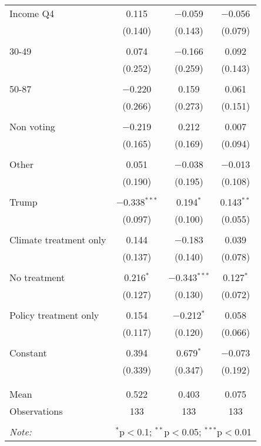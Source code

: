 \begin{tabular}{@{\extracolsep{5pt}}lccc}
 Income Q4 & 0.115 & $-$0.059 & $-$0.056 \\ 
  & (0.140) & (0.143) & (0.079) \\ 
  & & & \\ 
 30-49 & 0.074 & $-$0.166 & 0.092 \\ 
  & (0.252) & (0.259) & (0.143) \\ 
  & & & \\ 
 50-87 & $-$0.220 & 0.159 & 0.061 \\ 
  & (0.266) & (0.273) & (0.151) \\ 
  & & & \\ 
 Non voting & $-$0.219 & 0.212 & 0.007 \\ 
  & (0.165) & (0.169) & (0.094) \\ 
  & & & \\ 
 Other & 0.051 & $-$0.038 & $-$0.013 \\ 
  & (0.190) & (0.195) & (0.108) \\ 
  & & & \\ 
 Trump & $-$0.338$^{***}$ & 0.194$^{*}$ & 0.143$^{**}$ \\ 
  & (0.097) & (0.100) & (0.055) \\ 
  & & & \\ 
 Climate treatment only & 0.144 & $-$0.183 & 0.039 \\ 
  & (0.137) & (0.140) & (0.078) \\ 
  & & & \\ 
 No treatment & 0.216$^{*}$ & $-$0.343$^{***}$ & 0.127$^{*}$ \\ 
  & (0.127) & (0.130) & (0.072) \\ 
  & & & \\ 
 Policy treatment only & 0.154 & $-$0.212$^{*}$ & 0.058 \\ 
  & (0.117) & (0.120) & (0.066) \\ 
  & & & \\ 
 Constant & 0.394 & 0.679$^{*}$ & $-$0.073 \\ 
  & (0.339) & (0.347) & (0.192) \\ 
  & & & \\ 
\hline \\[-1.8ex] 
Mean & 0.522 & 0.403 & 0.075 \\ 
Observations & 133 & 133 & 133 \\ 
\hline 
\hline \\[-1.8ex] 
\textit{Note:}  & \multicolumn{3}{r}{$^{*}$p$<$0.1; $^{**}$p$<$0.05; $^{***}$p$<$0.01} \\ 
\end{tabular} 
